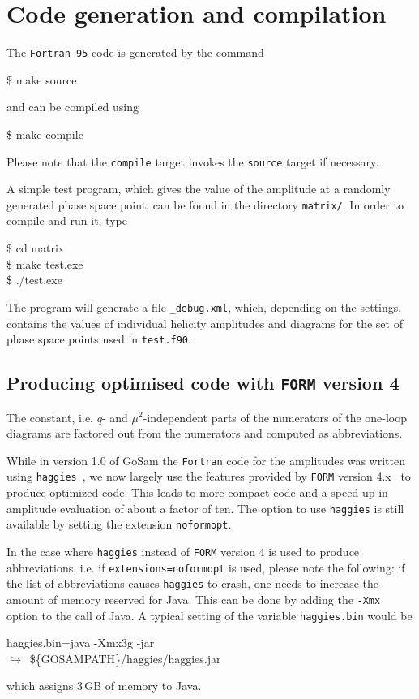 \documentclass[11pt,a4paper]{refrep}
\newcommand{\gosam}{{\sc GoSam}\xspace}
\newcommand{\form}{{\tt FORM}\xspace}
\newcommand{\fortranXC}{{\tt Fortran\,95}\xspace}
\newcommand{\haggies}{{\tt haggies}\xspace}
\newcommand{\contl}{{\ensuremath{\hookrightarrow}}}
\begin{document}
\section{Code generation and compilation}
The \fortranXC code is generated by the command
\begin{example}
\$ make source
\end{example}
and can be compiled using
\begin{example}
\$ make compile
\end{example}
Please note that the \texttt{compile} target invokes
the \texttt{source} target if necessary.

A simple test program,
which gives the value of the amplitude at a randomly generated phase space point,
can be found in the directory \texttt{matrix/}.
In order to compile and run it, type
\begin{example}
\$ cd matrix\\
\$ make test.exe\\
\$ ./test.exe
\end{example}
The program will generate a file \texttt{\_debug.xml},
which, depending on the settings, contains the values of individual  helicity amplitudes
and diagrams for the set of phase space points used in {\tt test.f90}.


\subsection{Producing optimised code  with {\tt FORM} version 4}

The constant, i.e. $q$- and $\mu^2$-independent parts of the numerators
of the one-loop diagrams are factored out from the numerators and computed
as abbreviations. 

While in version 1.0 of \gosam{} the {\tt Fortran} code for the
amplitudes was written using \haggies~\cite{Reiter:2009ts}, we now
largely use the features provided by \form{} version
4.x~\cite{Kuipers:2012rf} to produce optimized code. This leads to more
compact code and a speed-up in amplitude evaluation of about a factor
of ten.  The option to use \haggies{} is still available by setting
the extension {\tt noformopt}.

In the case where \haggies{} instead of \form version 4 is used to produce abbreviations, 
i.e. if {\tt extensions=noformopt} is used, please note the  following:
if the list of abbreviations causes \haggies{}
to crash, one needs to increase the amount of memory reserved for Java.
This can be done by adding the \texttt{-Xmx} option to the call of Java.
A typical setting of the variable \texttt{haggies.bin} would be
\begin{example}
haggies.bin=java -Xmx3g -jar \\
\contl\ \$\{GOSAMPATH\}/haggies/haggies.jar
\end{example}
which assigns 3\,GB of memory to Java.
\end{document}
